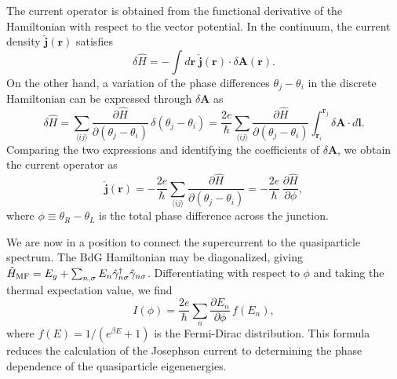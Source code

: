 \documentclass[11pt,a4paper,twoside,openany]{report}
\begin{document}
The current operator is obtained from the functional derivative of the Hamiltonian
with respect to the vector potential.  In the continuum, the current density
$\hat{\mathbf{j}}(\mathbf{r})$ satisfies
\begin{equation}
  \delta\hat{H} = -\int d\mathbf{r}\;\hat{\mathbf{j}}(\mathbf{r})\cdot \delta\mathbf{A}(\mathbf{r}).
\end{equation}
On the other hand, a variation of the phase differences $\theta_j-\theta_i$ in the
discrete Hamiltonian can be expressed through $\delta\mathbf{A}$ as
\begin{equation}
  \delta\hat{H}
  = \sum_{\langle ij\rangle} \frac{\partial\hat{H}}{\partial(\theta_j-\theta_i)}\,
    \delta(\theta_j-\theta_i)
  = \frac{2e}{\hbar} \sum_{\langle ij\rangle} \frac{\partial\hat{H}}{\partial(\theta_j-\theta_i)}
    \int_{\mathbf{r}_i}^{\mathbf{r}_j} \delta\mathbf{A}\cdot d\mathbf{l}.
\end{equation}
Comparing the two expressions and identifying the coefficients of $\delta\mathbf{A}$,
we obtain the current operator as
\begin{equation}
  \hat{\mathbf{j}}(\mathbf{r})
  = -\frac{2e}{\hbar} \sum_{\langle ij\rangle} \frac{\partial\hat{H}}{\partial(\theta_j-\theta_i)}
  = -\frac{2e}{\hbar}\,\frac{\partial\hat{H}}{\partial\phi},
\end{equation}
where $\phi \equiv \theta_R - \theta_L$ is the total phase difference across the junction.

We are now in a position to connect the supercurrent to the quasiparticle spectrum. The BdG Hamiltonian may be diagonalized, giving $\hat{H}_{\rm MF} = E_g + \sum_{n,\sigma} E_n \hat{\gamma}_{n\sigma}^{\dagger} \hat{\gamma}_{n\sigma}$. Differentiating with respect to $\phi$ and taking the thermal expectation value, we find
\begin{equation}
  \boxed{
  I(\phi) = \frac{2e}{\hbar} \sum_{n} \frac{\partial E_n}{\partial\phi}\, f(E_n) ,
  }
  \label{eq:I_from_spectrum}
\end{equation}
where $f(E) = 1/(e^{\beta E}+1)$ is the Fermi-Dirac distribution. This formula reduces the calculation of the Josephson current to determining the phase dependence of the quasiparticle eigenenergies.
\end{document}
